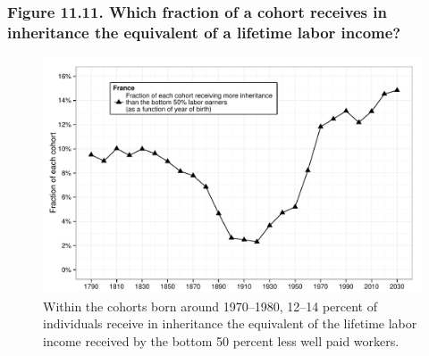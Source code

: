 \documentclass[t]{beamer}\usepackage[]{graphicx}\usepackage[]{color}
\newenvironment{knitrout}{}{} %
\begin{document}
\begin{frame}[label=Figure_11_11]
\frametitle{Figure 11.11. Which fraction of a cohort receives in inheritance the equivalent of a lifetime labor income?}
\begin{figure}[t]
\begin{minipage}[b]{\textwidth}
\centering
\begin{knitrout}\footnotesize
{}\color{fgcolor}

{\centering \includegraphics[width=1\linewidth]{figures/bw/Figure_11_11} 

}



\end{knitrout}
\caption{Within the cohorts born around 1970--1980, 12--14 percent of individuals receive in inheritance the equivalent of the lifetime labor income received by the bottom 50 percent less well paid workers.}
\end{minipage}
\end{figure}
\end{frame}
\end{document}
